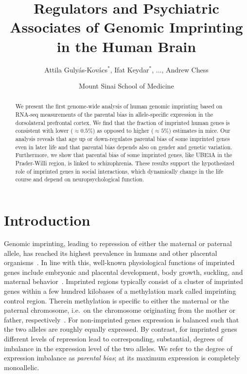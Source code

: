 \documentclass[letterpaper]{article}
\title{Regulators and Psychiatric Associates of Genomic Imprinting in the Human Brain}
\author{Attila Guly\'{a}s-Kov\'{a}cs\(^\ast\), Ifat Keydar\(^\ast\),
...,
Andrew Chess}
\date{Mount Sinai School of Medicine}
\begin{document}
\maketitle

\begin{abstract}
We present the first genome-wide analysis of human genomic imprinting based on
RNA-seq measurements of the parental bias in allele-specific expression in the
dorsolateral prefrontal cortex.  We find that the fraction of imprinted human
genes is consistent with lower (\(\approx 0.5\%\)) as opposed to higher
(\(\approx 5\%\)) estimates in mice.  Our analysis reveals that age up or
down-regulates parental bias of some imprinted genes even in later life and
that parental bias depends also on gender and genetic variation.  Furthermore,
we show that parental bias of some imprinted genes, like UBE3A in the
Prader-Willi region, is linked to schizophrenia.  These results support the
hypothesized role of imprinted genes in social interactions, which dynamically
change in the life course and depend on neuropsychological function.
\end{abstract}

\section{Introduction}

Genomic imprinting, leading to repression of either the maternal or paternal
allele, has reached its highest prevalence in humans and other placental
organisms~\cite{Renfree2012}.  In line with this, well-known physiological
functions of imprinted genes include embryonic and placental development, body
growth, suckling, and maternal behavior~\cite{Plasschaert2014,Peters2014}.
Imprinted  regions  typically consist of a cluster of imprinted genes within a
few hundred kilobases of a methylation mark called imprinting control region.
Therein methylation is specific to either the maternal or the paternal
chromosome, i.e.~on the chromosome originating from the mother or father,
respectively~\cite{Plasschaert2014}.
For non-imprinted genes expression is balanced such that the two alleles are
roughly equally expressed. By contrast, for imprinted genes different levels
of repression lead to corresponding, substantial, degrees of imbalance in the
expression level of the two alleles.  We refer to the degree of expression
imbalance as \emph{parental bias}; at its maximum expression is completely
monoallelic.
\end{document}
